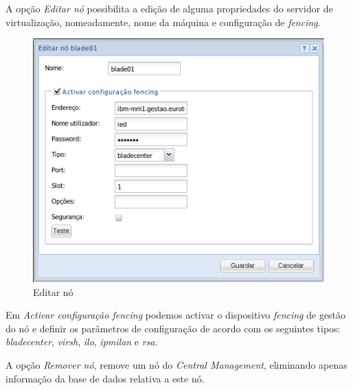 A opção \emph{Editar nó} possibilita a edição de alguma propriedades do servidor de virtualização, nomeadamente, nome da máquina e configuração de \emph{fencing}.
\begin{figure}[H]
	\begin{center}
	\includegraphics[scale=0.5]{screenshots/node_edit.png}
	\caption{Editar nó}
	\label{fig:node_edit}
	\end{center}
\end{figure}
\label{para:node_fencing_config}Em \emph{Activar configuração \emph{fencing}} podemos activar o dispositivo \emph{fencing} de gestão do nó e definir os parâmetros de configuração de acordo com os seguintes tipos: \emph{bladecenter}, \emph{virsh}, \emph{ilo}, \emph{ipmilan} e \emph{rsa}.

A opção \emph{Remover nó}, remove um nó do \emph{Central Management}, eliminando apenas informação da base de dados relativa a este nó.

